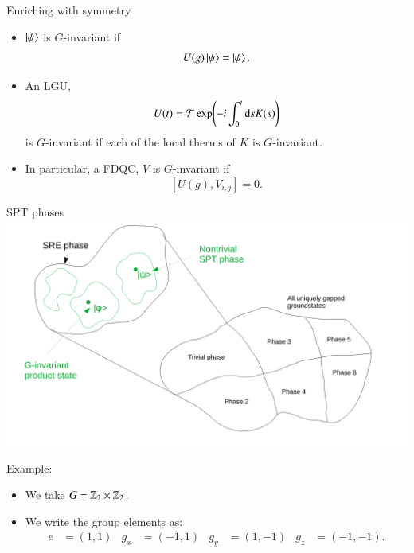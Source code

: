 \documentclass{beamer}
\begin{document}
\begin{frame}{Enriching with symmetry}
	\begin{itemize}
		\item<1-> $\ket{\psi}$ is $G$-invariant if
		\[U(g)\ket{\psi}=\ket{\psi}.\]
		\item<2-> An LGU,
		\[U(t)=\mathcal{T}\exp(-i\int_0^t \textrm{d} s K(s))\]
		is $G$-invariant if each of the local therms of $K$ is $G$-invariant.
		\item<3-> In particular, a FDQC, $V$ is $G$-invariant if
		\[[U(g),V_{i,j}]=0.\]
	\end{itemize}
\end{frame}

\begin{frame}{SPT phases}
	\includegraphics[width=\textwidth]{Figures/SPT_Phases.pdf}
\end{frame}

\begin{frame}{Example:}
	\begin{itemize}
		\item We take $G=\mathbb{Z}_2\times\mathbb{Z}_2$.
		\item We write the group elements as:
		\begin{align*}
			e&=(1,1)&g_x&=(-1,1)&g_y&=(1,-1)&g_z&=(-1,-1).
		\end{align*}
	\end{itemize}
	
\end{frame}
\end{document}
